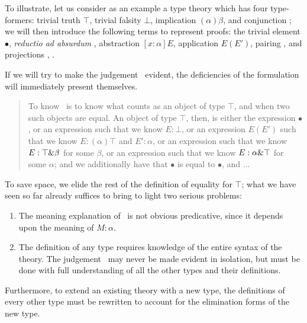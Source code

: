 \documentclass[main.tex]{subfiles}
\begin{document}
To illustrate, let us consider as an example a type theory which has four
type-formers: trivial truth $\top$, trivial falsity $\bot$, implication
$(\alpha)\beta$, and conjunction \product\alpha\beta; we will then introduce
the following terms to represent proofs: the trivial element $\bullet$,
\emph{reductio ad absurdum} , abstraction $[x:\alpha]E$,
application $E(E')$, pairing , and projections , .

If we will try to make the judgement \type\top\ evident, the deficiencies of
the formulation will immediately present themselves.

\begin{quote}
To know \type\top\ is to know what counts as an object of type $\top$, and when
two such objects are equal. An object of type $\top$, then, is either the
expression $\bullet$, or an expression  such that we know
$E:\bot$, or an expression $E(E')$ such that we know $E:(\alpha)\top$ and
$E':\alpha$, or an expression  such that we know $E:\top\&\beta$
for some $\beta$, or an expression  such that we know
$E:\alpha\&\top$ for some $\alpha$; and we additionally have that $\bullet$
is equal to $\bullet$, and ...
\end{quote}

To save space, we elide the rest of the definition of equality for $\top$; what
we have seen so far already suffices to bring to light two serious problems:

\begin{enumerate}

  \item The meaning explanation of \type\alpha\ is not obvious predicative,
  since it depends upon the meaning of $M:\alpha$.

  \item The definition of any type requires knowledge of the entire syntax of
  the theory. The judgement \type\alpha\ may never be made evident in isolation,
  but must be done with full understanding of all the other types and their definitions.

\end{enumerate}

Furthermore, to extend an existing theory with a new type, the definitions of
every other type must be rewritten to account for the elimination forms of the
new type.
\end{document}
